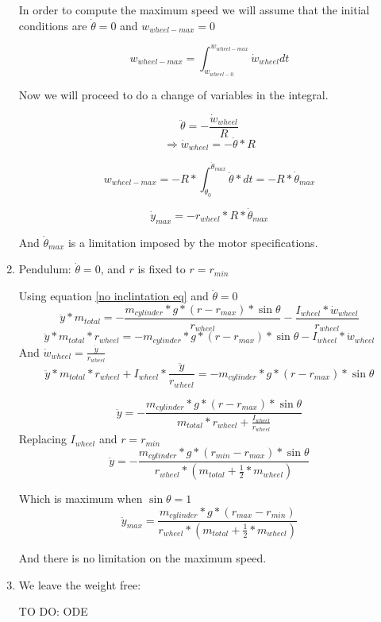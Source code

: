 \begin{enumerate}
    In order to compute the maximum speed we will assume that the initial conditions are $\dot{\theta} = 0$ and $w_{wheel-max}=0$

    \[w_{wheel-max} = \int_{w_{wheel-0}}^{w_{wheel-max}} \dot{w}_{wheel} dt\]

    Now we will proceed to do a change of variables in the integral.
    
    \[\ddot{\theta} = -\frac{\dot{w}_{wheel}}{R}\]
    \[\Rightarrow \dot{w}_{wheel} = - \ddot{\theta} * R \] 

    \[w_{wheel-max} = -R * \int_{\dot{\theta}_0}^{\dot{\theta}_{max}} \ddot{\theta} *   dt = -R * \dot{\theta}_{max}\]

    \[\boxed{\dot{y}_{max} = - r_{wheel} * R * \dot{\theta}_{max}}\]

    And $\dot{\theta}_{max}$ is a limitation imposed by the motor specifications.




    \item Pendulum: $\dot{\theta} = 0$, and $r$ is fixed to $r = r_{min}$
    
    Using equation \ref{no inclintation eq} and $\ddot{\theta} = 0$
    \[\ddot{y}*m_{total} = - \frac{m_{cylinder} * g * (r - r_{max}) * \sin{\theta}}{r_{wheel}} - \frac{I_{wheel} * \dot{w}_{wheel}}{r_{wheel}}\]
    \[\ddot{y}*m_{total} * r_{wheel} = - m_{cylinder} * g * (r - r_{max}) * \sin{\theta} - I_{wheel} * \dot{w}_{wheel}\]
    And $\dot{w}_{wheel} = \frac{\ddot{y}}{r_{wheel}}$
    \[\ddot{y}*m_{total} * r_{wheel} + I_{wheel} * \frac{\ddot{y}}{r_{wheel}} = - m_{cylinder} * g * (r - r_{max}) * \sin{\theta} \]

    \[\ddot{y}  = -\frac{m_{cylinder} * g * (r - r_{max}) * \sin{\theta}}{m_{total} * r_{wheel} + \frac{I_{wheel}}{r_{wheel}} }  \]
    Replacing $I_{wheel}$ and $r=r_{min}$
    \[\ddot{y}  = -\frac{m_{cylinder} * g * (r_{min} - r_{max}) * \sin{\theta}}{ r_{wheel} * (m_{total} + \frac{1}{2} * m_{wheel}) }  \]

    Which is maximum when $\sin{\theta}=1$
    \[\boxed{\ddot{y}_{max}  = \frac{m_{cylinder} * g * (r_{max}- r_{min})}{ r_{wheel} * (m_{total} + \frac{1}{2} * m_{wheel}) } } \]
    
    And there is no limitation on the maximum speed.

    \item We leave the weight free:
    
    TO DO: ODE    
\end{enumerate}

